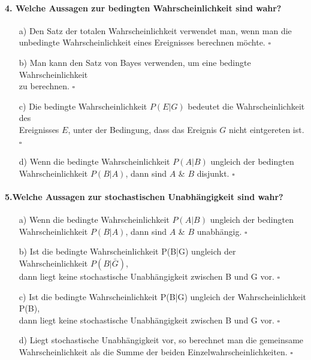 \documentclass[a4paper]{article}
\begin{document}
\paragraph{4. Welche Aussagen zur bedingten Wahrscheinlichkeit sind wahr?}
\begin{itemize}
    \item[a)] Den Satz der totalen Wahrscheinlichkeit verwendet man, wenn man die \\unbedingte Wahrscheinlichkeit eines Ereignisses berechnen möchte. \hfill $\square$
    \item[b)] Man kann den Satz von Bayes verwenden, um eine bedingte Wahrscheinlichkeit\\ zu berechnen. \hfill $\square$
    \item[c)] Die bedingte Wahrscheinlichkeit $P(E|G)$ bedeutet die Wahrscheinlichkeit des\\ Ereignisses $E$, unter der Bedingung, dass das Ereignis $G$ nicht eintgereten ist. \hfill $\square$
    \item[d)] Wenn die bedingte Wahrscheinlichkeit $P(A|B)$ ungleich der bedingten\\Wahrscheinlichkeit $P(B|A)$, dann sind $A$ \& $B$ disjunkt. \hfill $\square$
\end{itemize}

\paragraph{5.Welche Aussagen zur stochastischen Unabhängigkeit sind wahr?}
\begin{itemize}
    \item[a)] Wenn die bedingte Wahrscheinlichkeit $P(A|B)$ ungleich der bedingten\\Wahrscheinlichkeit $P(B|A)$, dann sind $A$ \& $B$ unabhängig. \hfill $\square$
    \item[b)] Ist die bedingte Wahrscheinlichkeit P(B|G) ungleich der Wahrscheinlichkeit $P(B|\bar G)$, \\dann liegt keine stochastische Unabhängigkeit zwischen B und G vor. \hfill $\square$
    \item[c)] Ist die bedingte Wahrscheinlichkeit P(B|G) ungleich der Wahrscheinlichkeit P(B), \\dann liegt keine stochastische Unabhängigkeit zwischen B und G vor. \hfill $\square$
    \item[d)] Liegt stochastische Unabhängigkeit vor, so berechnet man die gemeinsame\\ Wahrscheinlichkeit als die Summe der beiden Einzelwahrscheinlichkeiten. \hfill $\square$
\end{itemize}
\end{document}
